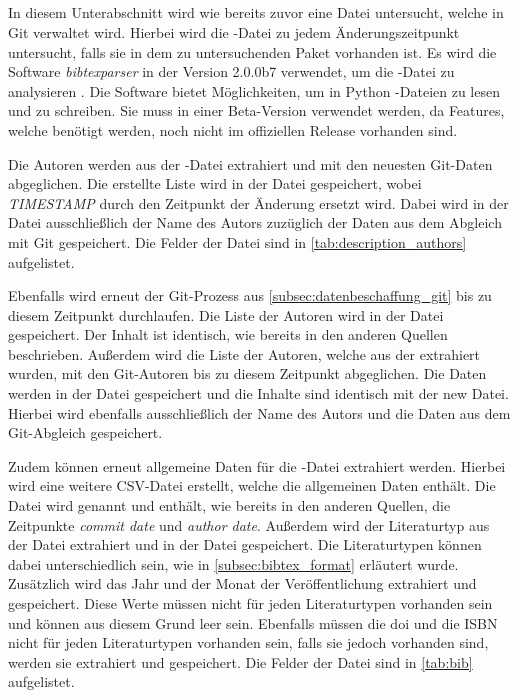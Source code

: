 \subsection{}
\label{subsec:datenbeschaffung_bibtex}
In diesem Unterabschnitt wird wie bereits zuvor eine Datei untersucht, welche in Git verwaltet wird.
Hierbei wird die -Datei zu jedem Änderungszeitpunkt untersucht, falls sie in dem zu untersuchenden Paket vorhanden ist.
Es wird die Software \emph{bibtexparser} in der Version 2.0.0b7 verwendet, um die -Datei zu analysieren \autocite{weiss_python-bibtexparser_2024}.
Die Software bietet Möglichkeiten, um in Python -Dateien zu lesen und zu schreiben.
Sie muss in einer Beta-Version verwendet werden, da Features, welche benötigt werden, noch nicht im offiziellen Release vorhanden sind.

Die Autoren werden aus der -Datei extrahiert und mit den neuesten Git-Daten abgeglichen.
Die erstellte Liste wird in der Datei  gespeichert, wobei \emph{TIMESTAMP} durch den Zeitpunkt der Änderung ersetzt wird.
Dabei wird in der Datei ausschließlich der Name des Autors zuzüglich der Daten aus dem Abgleich mit Git gespeichert.
Die Felder der Datei sind in \autoref{tab:description_authors} aufgelistet.

Ebenfalls wird erneut der Git-Prozess aus \autoref{subsec:datenbeschaffung_git} bis zu diesem Zeitpunkt durchlaufen.
Die Liste der Autoren wird in der Datei  gespeichert.
Der Inhalt ist identisch, wie bereits in den anderen Quellen beschrieben.
Außerdem wird die Liste der Autoren, welche aus der  extrahiert wurden, mit den Git-Autoren bis zu diesem Zeitpunkt abgeglichen.
Die Daten werden in der Datei  gespeichert und die Inhalte sind identisch mit der \glqq new\grqq{} Datei.
Hierbei wird ebenfalls ausschließlich der Name des Autors und die Daten aus dem Git-Abgleich gespeichert.

Zudem können erneut allgemeine Daten für die -Datei extrahiert werden.
Hierbei wird eine weitere CSV-Datei erstellt, welche die allgemeinen Daten enthält.
Die Datei wird  genannt und enthält, wie bereits in den anderen Quellen, die Zeitpunkte \emph{commit date} und \emph{author date}.
Außerdem wird der Literaturtyp aus der Datei extrahiert und in der Datei gespeichert.
Die Literaturtypen können dabei unterschiedlich sein, wie in \autoref{subsec:bibtex_format} erläutert wurde.
Zusätzlich wird das Jahr und der Monat der Veröffentlichung extrahiert und gespeichert.
Diese Werte müssen nicht für jeden Literaturtypen vorhanden sein und können aus diesem Grund leer sein.
Ebenfalls müssen die \gls{doi} und die ISBN nicht für jeden Literaturtypen vorhanden sein, falls sie jedoch vorhanden sind, werden sie extrahiert und gespeichert.
Die Felder der Datei sind in \autoref{tab:bib} aufgelistet.

